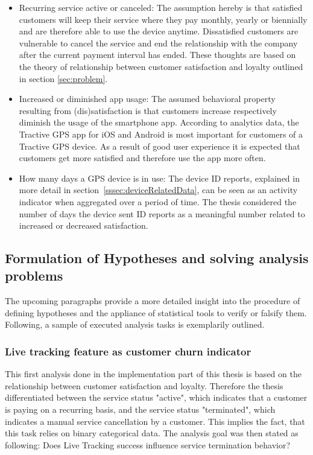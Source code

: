 \begin{itemize}
	\item Recurring service active or canceled: The assumption hereby is that satisfied customers will keep their service where they pay monthly, yearly or biennially and are therefore able to use the device anytime. Dissatisfied customers are vulnerable to cancel the service and end the relationship with the company after the current payment interval has ended. These thoughts are based on the theory of relationship between customer satisfaction and loyalty outlined in section \ref{sec:problem}.
	\item Increased or diminished app usage: The assumed behavioral property resulting from (dis)satisfaction is that customers increase respectively diminish the usage of the smartphone app. According to analytics data, the Tractive GPS app for iOS and Android is most important for customers of a Tractive GPS device. As a result of good user experience it is expected that customers get more satisfied and therefore use the app more often.
	\item How many days a GPS device is in use: The device ID reports, explained in more detail in section~\ref{sssec:deviceRelatedData}, can be seen as an activity indicator when aggregated over a period of time. The thesis considered the number of days the device sent ID reports as a meaningful number related to increased or decreased satisfaction.
\end{itemize}

\subsection{Formulation of Hypotheses and solving analysis problems}
The upcoming paragraphs provide a more detailed insight into the procedure of defining hypotheses and the appliance of statistical tools to verify or falsify them. Following, a sample of executed analysis tasks is exemplarily outlined. 

\subsubsection{Live tracking feature as customer churn indicator}
This first analysis done in the implementation part of this thesis is based on the relationship between customer satisfaction and loyalty. Therefore the thesis differentiated between the service status "active", which indicates that a customer is paying on a recurring basis, and the service status "terminated", which indicates a manual service cancellation by a customer. This implies the fact, that this task relies on binary categorical data. The analysis goal was then stated as following: Does Live Tracking success influence service termination behavior?

